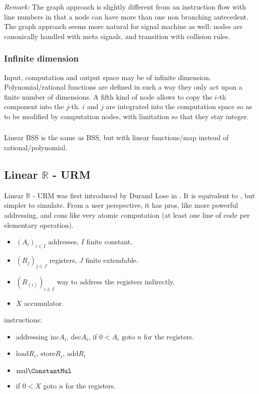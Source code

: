 \emph{Remark:} The graph approach is slightly different from an instruction flow with line numbers in that a node can have more than one non branching antecedent.
The graph approach seems more natural for signal machine as well: nodes are canonically handled with meta signals, and transition with collision rules.

\subsubsection{Infinite dimension}
Input, computation and output space may be of infinite dimension.
Polynomial/rational functions are defined in such a way they only act upon a finite number of dimensions.
A fifth kind of node allows to copy the $i$-th component into the $j$-th.
$i$ and $j$ are integrated into the computation space so as to be modified by computation nodes, with limitation so that they stay integer.

\subsubsection{\LBSS}
Linear BSS is the same as BSS, but with linear functions/map instead of rational/polynomial.

\subsection{Linear $\mathbb{R}$ - URM}
Linear $\mathbb{R}$ - URM was first introduced by Durand Lose in \cite{durand-lose07cie}.
It is equivalent to \LBSS, but simpler to simulate.
From a user perspective, it has pros, like more powerful addressing, and cons like very atomic computation (at least one line of code per elementary operation).

\begin{itemize}
	\item $(A_i)_{i\in I}$ addresses, $I$ finite constant.
	\item $(R_j)_{j\in J}$ registers, $J$ finite extendable.
	\item $(R_(i))_{i\in I}$ way to address the registers indirectly.
	\item $X$ accumulator.
\end{itemize}

instructions: 
\begin{itemize}
	\item addressing $\text{inc}A_i$, $\text{dec}A_i$, if $0<A_i \text{ goto } n$ for the registers.
	\item $\text{load} R_{i}$, $\text{store} R_{i}$, $\text{add} R_{i}$
	\item $\text{mul}\ConstantMul$
	\item if $0<X$ goto $n$ for the registers.
\end{itemize}

